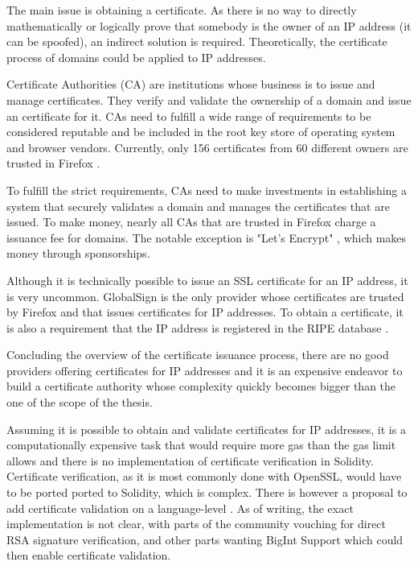The main issue is obtaining a certificate. As there is no way to directly mathematically or logically prove that somebody is the owner of an IP address (it can be spoofed), an indirect solution is required. Theoretically, the certificate process of domains could be applied to IP addresses.

Certificate Authorities (CA) are institutions whose business is to issue and manage certificates. They verify and validate the ownership of a domain and issue an certificate for it. CAs need to fulfill a wide range of requirements \cite{BaselineRequirements} to be considered reputable and be included in the root key store of operating system and browser vendors. Currently, only 156 certificates from 60 different owners are trusted in Firefox \cite{httpscca67}.

To fulfill the strict requirements, CAs need to make investments in establishing a system that securely validates a domain and manages the certificates that are issued. To make money, nearly all CAs that are trusted in Firefox charge a issuance fee for domains. The notable exception is "Let's Encrypt" \cite{LetsEncrypt}, which makes money through sponsorships.

Although it is technically possible to issue an SSL certificate for an IP address, it is very uncommon. GlobalSign \cite{GlobalSign} is the only provider whose certificates are trusted by Firefox and that issues certificates for IP addresses. To obtain a certificate, it is also a requirement that the IP address is registered in the RIPE database \cite{Database95}.

Concluding the overview of the certificate issuance process, there are no good providers offering certificates for IP addresses and it is an expensive endeavor to build a certificate authority whose complexity quickly becomes bigger than the one of the scope of the thesis.

Assuming it is possible to obtain and validate certificates for IP addresses, it is a computationally expensive task that would require more gas than the gas limit allows and there is no implementation of certificate verification in Solidity. Certificate verification, as it is most commonly done with OpenSSL, would have to be ported ported to Solidity, which is complex.
There is however a proposal to add certificate validation on a language-level \cite{EIP74}. As of writing, the exact implementation is not clear, with parts of the community vouching for direct RSA signature verification, and other parts wanting BigInt Support which could then enable certificate validation.

